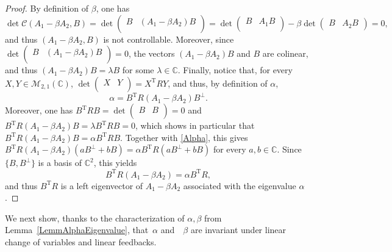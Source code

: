 \documentclass[JEP,XML,SOM,Unicode]{cedram}
\theoremstyle{plain}
\theoremstyle{definition}
\newcommand{\transp}{{\scriptscriptstyle\mathrm{T}}}
\begin{document}
\begin{proof}
By definition of $\beta$, one has
\[\det\mathcal C(A_1 - \beta A_2, B) = \det\begin{pmatrix} B & (A_1 - \beta A_2) B\\\end{pmatrix} = \det\begin{pmatrix} B & A_1 B\\\end{pmatrix} - \beta \det\begin{pmatrix}B & A_2 B\end{pmatrix} = 0,\]
and thus $(A_1 - \beta A_2, B)$ is not controllable. Moreover, since $\det\begin{pmatrix} B & (A_1 - \beta A_2) B\\\end{pmatrix}  = 0$, the vectors $(A_1 - \beta A_2) B$ and $B$ are colinear, and thus $(A_1 - \beta A_2) B = \lambda B$ for some $\lambda \in \mathbb C$. Finally, notice that, for every $X, Y \in \mathcal M_{2, 1}(\mathbb C)$, $\det\begin{pmatrix}X & Y\\\end{pmatrix} = X^\transp R Y$, and thus, by definition of $\alpha$,
\begin{equation}
\label{Alpha}
\alpha = B^\transp R (A_1 - \beta A_2) B^\perp.
\end{equation}
Moreover, one has $B^\transp R B = \det\begin{pmatrix}B & B \\\end{pmatrix} = 0$ and $B^\transp R (A_1 - \beta A_2) B = \lambda B^\transp R B = 0$, which shows in particular that $B^\transp R (A_1 - \beta A_2) B = \alpha B^\transp R B$. Together with \eqref{Alpha}, this gives $B^\transp R (A_1 - \beta A_2) (a B^\perp  + b B) = \alpha B^\transp R (a B^\perp + b B)$ for every $a, b \in \mathbb C$. Since $\{B, B^\perp\}$ is a basis of $\mathbb C^2$, this yields
\[B^\transp R (A_1 - \beta A_2) = \alpha B^\transp R,\]
and thus $B^\transp R$ is a left eigenvector of $A_1 - \beta A_2$ associated with the eigenvalue $\alpha$.
\end{proof}

We next show, thanks to the characterization of $\alpha, \beta$ from Lemma~\ref{LemmAlphaEigenvalue}, that~$\alpha$ and~ $\beta$ are invariant under linear change of variables and linear feedbacks.
\end{document}
